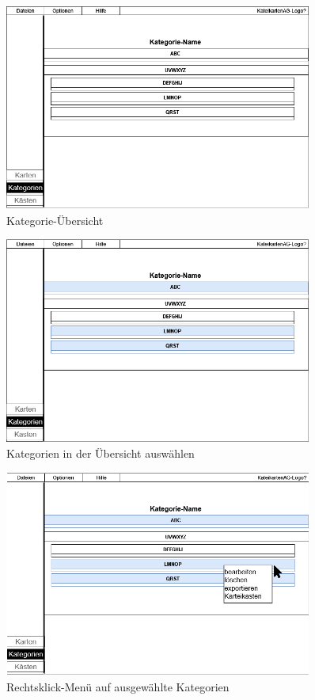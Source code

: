 \documentclass[fontsize=12pt,paper=a4,twoside]{scrartcl}
\begin{document}
\begin{figure}
	\centering
	\caption{Kategorie-Übersicht}
	\label{fig:cat_deck_1}
	\includegraphics[width=0.9\textwidth]{mockup_categories_deck_1.png}
\end{figure}
\begin{figure}
	\centering
	\caption{Kategorien in der Übersicht auswählen}
	\label{fig:cat_deck_2}
	\includegraphics[width=0.9\textwidth]{mockup_categories_deck_2.png}
\end{figure}
\begin{figure}
	\centering
	\caption{Rechtsklick-Menü auf ausgewählte Kategorien}
	\label{fig:cat_deck_3}
	\includegraphics[width=0.9\textwidth]{mockup_categories_deck_3.png}
\end{figure}
\end{document}
